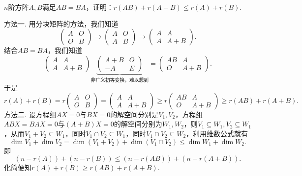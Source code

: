 \begin{exercise}
\begin{exgroup}
        \item $n$阶方阵$A,B$满足$AB=BA$，证明：$r(AB)+r(A+B) \leqslant r(A)+r(B)$.
        \begin{answer}
            方法一. 用分块矩阵的方法，我们知道
          \[ \begin{pmatrix}
                  A & O \\
                  O & B
              \end{pmatrix}
              \rightarrow
              \begin{pmatrix}
                  A & O \\
                  A & B
              \end{pmatrix}
              \rightarrow
              \begin{pmatrix}
                  A & A   \\
                  A & A+B
              \end{pmatrix}. \]
          结合$AB=BA$，我们知道
          \[ \begin{pmatrix}
                  A & A   \\
                  A & A+B
              \end{pmatrix}
              \underbrace{
                  \begin{pmatrix}
                      A+B & O \\
                      -A  & E
                  \end{pmatrix}
              }_{\text{非广义初等变换，难以想到}}
              =
              \begin{pmatrix}
                  AB & A   \\
                  O  & A+B
              \end{pmatrix}. \]
          于是
          \[ r(A)+r(B)=r
              \begin{pmatrix}
                  A & O \\
                  O & B
              \end{pmatrix}=
              \begin{pmatrix}
                  A & A   \\
                  A & A+B
              \end{pmatrix}\geqslant r
              \begin{pmatrix}
                  AB & A   \\
                  O  & A+B
              \end{pmatrix}\geqslant
              r(AB)+r(A+B). \]
          方法二. 设方程组$AX=0$与$BX=0$的解空间分别是$V_1, V_2$，方程组$ABX=BAX=0$与$(A+B)X=0$的解空间分别为$W_1, W_2$，则$V_1\subseteq W_1, V_2\subseteq W_1$，从而$V_1+V_2\subseteq W_1$，同时$V_1\cap V_2\subseteq W_1$，同时$V_1\cap V_2\subseteq W_2$，利用维数公式就有
          \[ \dim V_1+\dim V_2=\dim(V_1+V_2)+\dim(V_1\cap V_2)\leqslant \dim W_1+\dim W_2. \]
          即
          \[ (n-r(A))+(n-r(B))\leqslant (n-r(AB))+(n-r(A+B)). \]
          化简便知$r(A)+r(B)\geqslant r(AB)+r(A+B)$.
        \end{answer}


\end{exgroup}
\end{exercise}
